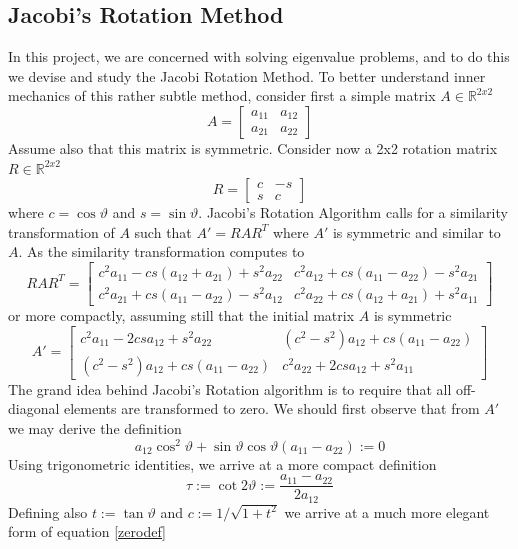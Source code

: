 	\subsection{Jacobi's Rotation Method}
	In this project, we are concerned with solving eigenvalue problems, and to do this we devise and study the Jacobi Rotation Method. To better understand inner mechanics of this rather subtle method, consider first a simple matrix $A \in \mathbb{R}^{2x2}$
	\[
	A = 
	\begin{bmatrix}
		a_{11} & a_{12}\\
		a_{21} & a_{22}
	\end{bmatrix}
	\]
	Assume also that this matrix is symmetric. Consider now a 2x2 rotation matrix $R \in \mathbb{R}^{2x2}$ 
	\[ R = 
	\begin{bmatrix}
		c & -s\\
		s & c
	\end{bmatrix}
	\]
	where $c = \cos \vartheta$ and $s = \sin \vartheta$. Jacobi's Rotation Algorithm calls for a similarity transformation of $A$ such that $A' = RAR^T$ where $A'$ is symmetric and similar to $A$. As the similarity transformation computes to 
	\[
	RAR^T = 
	\begin{bmatrix}
	c^2a_{11}- cs(a_{12} + a_{21}) + s^2a_{22} & c^2a_{12} + cs(a_{11} - a_{22}) - s^2a_{21}\\
	c^2a_{21} + cs(a_{11} - a_{22}) -s^2a_{12} & c^2a_{22} + cs(a_{12} + a_{21}) + s^2a_{11}
	\end{bmatrix}
 	\]
 	or more compactly, assuming still that the initial matrix $A$ is symmetric
 	\[
 	A' = 
 	\begin{bmatrix}
 		c^2a_{11} -2csa_{12} + s^2a_{22} & (c^2-s^2)a_{12} + cs(a_{11} - a_{22})\\
 		(c^2 - s^2)a_{12} + cs(a_{11} - a_{22}) & c^2a_{22} + 2csa_{12} + s^2a_{11}
 	\end{bmatrix}
 	\]
 	The grand idea behind Jacobi's Rotation algorithm is to require that all off-diagonal elements are transformed to zero. We should first observe that from $A'$ we may derive the definition
 	\begin{equation}
 		a_{12}\cos^2 \vartheta + \sin \vartheta \cos\vartheta (a_{11} - a_{22}) := 0
 		\label{zerodef}
 	\end{equation}
 	Using trigonometric identities, we arrive at a more compact definition
 	\[
 	\tau := \cot 2\vartheta := \frac{a_{11} - a_{22}}{2a_{12}}
 	\]
 	Defining also $t := \tan \vartheta$ and $c := 1/\sqrt{1+t^2}$ we arrive at a much more elegant form of equation \eqref{zerodef}
